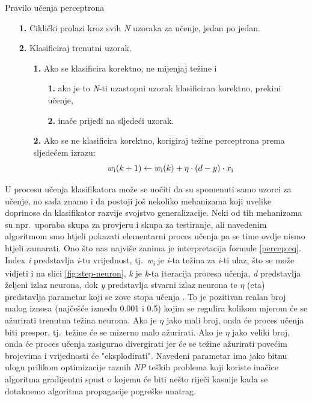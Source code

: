 \documentclass[times, utf8, zavrsni]{fer}
\begin{document}
\begin{algorithm}
\caption{Pravilo učenja perceptrona\footnotemark}
\label{algo:alg-perceptron}
    \begin{enumerate}
        \item[\textbf{1.}] Ciklički prolazi kroz svih \textit{N} uzoraka za učenje, jedan po jedan.
        \item[\textbf{2.}] Klasificiraj trenutni uzorak.
        \begin{enumerate}
            \item[\textbf{1.}] Ako se klasificira korektno, ne mijenjaj težine i
            \begin{enumerate}
                \item[\textbf{1.}] ako je to \textit{N}-ti uzastopni uzorak klasificiran korektno, prekini učenje,
                \item[\textbf{2.}] inače prijeđi na sljedeći uzorak.
            \end{enumerate}
            \item[\textbf{2.}] Ako se ne klasificira korektno, korigiraj težine perceptrona prema sljedećem izrazu: 
            \begin{equation}
            \label{percep:eq}
                w\textsubscript{i}(k+1) \leftarrow w\textsubscript{i}(k) + \eta \cdot (d-y) \cdot x\textsubscript{i}
            \end{equation}
        \end{enumerate}
    \end{enumerate}
\end{algorithm}

U procesu učenja klasifikatora može se uočiti da su spomenuti samo uzorci za učenje, no sada znamo i da postoji još nekoliko mehanizama koji uvelike doprinose da klasifikator razvije svojstvo generalizacije. Neki od tih mehanizama su npr.\ uporaba skupa za provjeru i skupa za testiranje, ali navedenim algoritmom smo htjeli pokazati elementarni proces učenja pa se time ovdje nismo htjeli zamarati. Ono što nas najviše zanima je interpretacija formule \eqref{percep:eq}. Index \textit{i} predstavlja \textit{i}-tu vrijednost, tj.\ \textit{w\textsubscript{i}} je \textit{i}-ta težina za \textit{i}-ti ulaz, što se može vidjeti i na slici \ref{fig:step-neuron}, \textit{k} je \textit{k}-ta iteracija procesa učenja, \textit{d} predstavlja željeni  izlaz neurona, dok \textit{y} predstavlja stvarni izlaz neurona te $\eta$ (eta) predstavlja parametar koji se zove stopa učenja . To je pozitivan realan broj malog iznosa (najčešće između 0.001 i 0.5) kojim se regulira kolikom mjerom će se ažurirati trenutna težina neurona. Ako je $\eta$ jako mali broj, onda će proces učenja biti prespor, tj.\ težine će se mizerno malo ažurirati. Ako je $\eta$ jako veliki broj, onda će proces učenja zasigurno divergirati jer će se težine ažurirati povećim brojevima i vrijednosti će "eksplodirati". Navedeni parametar ima jako bitnu ulogu prilikom optimizacije raznih \textit{NP} teških problema koji koriste inačice algoritma gradijentni spust o kojemu će biti nešto riječi kasnije kada se dotaknemo algoritma propagacije pogreške unatrag.
\end{document}
